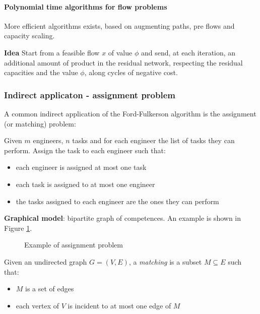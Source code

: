 \documentclass[english]{article}
\begin{document}
\paragraph{Polynomial time algorithms for flow problems}

More efficient algorithms exists, based on augmenting paths, pre flows and capacity scaling.

\bigskip
\textbf{Idea}
Start from a feasible flow \(x\) of value \(\phi\) and send, at each iteration, an additional amount of product in the residual network, respecting the residual capacities and the value \(\phi\), along cycles of negative cost.

\subsubsection{Indirect applicaton - assignment problem}

A common indirect application of the Ford-Fulkerson algorithm is the assignment (or matching) problem:

Given \(m\) engineers, \(n\) tasks and for each engineer the list of tasks they can perform.
Assign the task to each engineer such that:

\begin{itemize}
  \item each engineer is assigned at most one task
  \item each task is assigned to at most one engineer
  \item the tasks assigned to each engineer are the ones they can perform
\end{itemize}

\bigskip
\textbf{Graphical model}:
bipartite graph of competences.
An example is shown in Figure \ref{fig:assignment-example}.

\begin{figure}[htbp]
  \bigskip
  \centering
  \caption{Example of assignment problem}
  \label{fig:assignment-example}
  \bigskip
\end{figure}

\bigskip
\begin{definition}[matching]
  Given an undirected graph \(G = \left( V, E \right)\), a \textit{matching} is a subset \(M \subseteq E\) such that:
  \begin{itemize}
    \item \(M\) is a set of edges
    \item each vertex of \(V\) is incident to at most one edge of \(M\)
  \end{itemize}
  \label{def:matching}
\end{definition}
\end{document}
